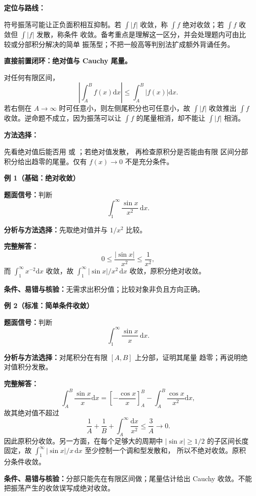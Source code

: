 \begin{knowledgeBox}
\textbf{定位与路线：}

符号振荡可能让正负面积相互抑制。若 \(\int|f|\) 收敛，称
\(\int f\) 绝对收敛；若 \(\int f\) 收敛但 \(\int|f|\) 发散，称条件
收敛。备考重点是理解这一区分，并会处理题内可由比较或分部积分解决的简单
振荡型；不把一般高等判别法扩成额外背诵任务。

\textbf{直接前置闭环：绝对值与 Cauchy 尾量。}

对任何有限区间，
\[
\left|\int_A^Bf(x)\mathrm dx\right|
\le\int_A^B|f(x)|\mathrm dx.
\]
若右侧在 \(A\to\infty\) 时可任意小，则左侧尾积分也可任意小，故
\(\int|f|\) 收敛推出 \(\int f\) 收敛。逆命题不成立，因为振荡可以让
\(\int f\) 的尾量相消，却不能让 \(\int|f|\) 相消。

\textbf{方法选择：}

先看绝对值后能否用
或
；若绝对值发散，
再检查原积分是否能由有限
区间分部积分给出趋零的尾量。仅有 \(f(x)\to0\) 不是充分条件。

\textbf{例 1（基础：绝对收敛）}

\textbf{题面信号：}判断
\[
\int_1^\infty\frac{\sin x}{x^2}\,\mathrm dx.
\]

\textbf{分析与方法选择：}先取绝对值并与 \(1/x^2\) 比较。

\textbf{完整解答：}
\[
0\le\frac{|\sin x|}{x^2}\le\frac1{x^2},
\]
而 \(\int_1^\infty x^{-2}\mathrm dx\) 收敛，故
\(\int_1^\infty|\sin x|/x^2\,\mathrm dx\) 收敛，原积分绝对收敛。

\textbf{条件、易错与核验：}无需求出积分值；比较对象非负且方向正确。

\textbf{例 2（标准：简单条件收敛）}

\textbf{题面信号：}判断
\[
\int_1^\infty\frac{\sin x}{x}\,\mathrm dx.
\]

\textbf{分析与方法选择：}对尾积分在有限 \([A,B]\) 上分部，证明其尾量
趋零；再说明绝对值积分发散。

\textbf{完整解答：}
\[
\int_A^B\frac{\sin x}{x}\mathrm dx
=\left[-\frac{\cos x}{x}\right]_A^B
-\int_A^B\frac{\cos x}{x^2}\mathrm dx,
\]
故其绝对值不超过
\[
\frac1A+\frac1B+\int_A^\infty\frac{\mathrm dx}{x^2}
\le\frac3A\to0.
\]
因此原积分收敛。另一方面，在每个足够大的周期中
\(|\sin x|\ge1/2\) 的子区间长度固定，故
\(\int_1^\infty|\sin x|/x\,\mathrm dx\) 至少控制一个调和型发散和，
所以不绝对收敛。原积分条件收敛。

\textbf{条件、易错与核验：}分部只能先在有限区间做；尾量估计给出
Cauchy 收敛。不能把振荡产生的收敛误写成绝对收敛。


\end{knowledgeBox}
